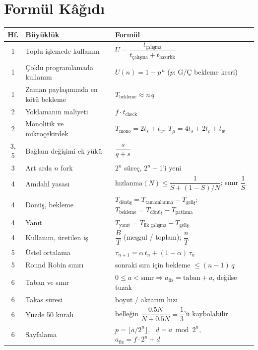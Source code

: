 \documentclass[11pt,a4paper]{article}
\begin{document}
\section{Formül Kâğıdı}
\label{sec:sheet}
\begin{center}
\small
\renewcommand{\arraystretch}{1.55}
\begin{tabularx}{\linewidth}{@{}c >{\raggedright\arraybackslash}p{4.3cm} >{\raggedright\arraybackslash}X@{}}
\toprule
\textbf{Hf.} & \textbf{Büyüklük} & \textbf{Formül} \\
\midrule
1 & Toplu işlemede kullanım & $U = \dfrac{t_{\text{çalışma}}}{t_{\text{çalışma}} + t_{\text{hazırlık}}}$ \\
1 & Çoklu programlamada kullanım & $U(n) = 1 - p^{\,n}$ \quad ($p$: G/Ç bekleme kesri) \\
1 & Zaman paylaşımında en kötü bekleme & $T_{\text{bekleme}} \approx n\,q$ \\
2 & Yoklamanın maliyeti & $f \cdot t_{\text{check}}$ \\
2 & Monolitik ve mikroçekirdek & $T_{\text{mono}} = 2t_s + t_w$; \quad $T_{\mu} = 4t_s + 2t_c + t_w$ \\
3, 5 & Bağlam değişimi ek yükü & $\dfrac{s}{q+s}$ \\
3 & Art arda $n$ fork & $2^{n}$ süreç, $2^{n}-1$'i yeni \\
4 & Amdahl yasası & $\text{hızlanma}(N) \le \dfrac{1}{S + (1-S)/N}$; \quad sınır $\dfrac{1}{S}$ \\
4 & Dönüş, bekleme & $T_{\text{dönüş}} = T_{\text{tamamlanma}} - T_{\text{geliş}}$; \quad $T_{\text{bekleme}} = T_{\text{dönüş}} - T_{\text{patlama}}$ \\
4 & Yanıt & $T_{\text{yanıt}} = T_{\text{ilk çalışma}} - T_{\text{geliş}}$ \\
4 & Kullanım, üretilen iş & $\dfrac{B}{T}$ (meşgul / toplam); \quad $\dfrac{n}{T}$ \\
5 & Üstel ortalama & $\tau_{n+1} = \alpha\, t_n + (1-\alpha)\, \tau_n$ \\
5 & Round Robin sınırı & sonraki sıra için bekleme $\le (n-1)\,q$ \\
6 & Taban ve sınır & $0 \le a < \text{sınır} \Rightarrow a_{\text{fiz}} = \text{taban} + a$, değilse tuzak \\
6 & Takas süresi & boyut / aktarım hızı \\
6 & Yüzde 50 kuralı & belleğin $\dfrac{0.5N}{N + 0.5N} = \dfrac13$'ü kaybolabilir \\
6 & Sayfalama & $p = \lfloor a / 2^{n}\rfloor$, \ $d = a \bmod 2^{n}$, \ $a_{\text{fiz}} = f\cdot 2^{n} + d$ \\

\end{tabularx}
\end{center}
\end{document}
